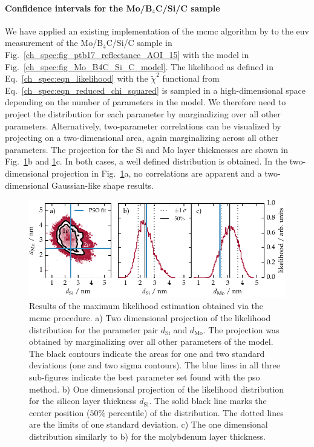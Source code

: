 \paragraph{Confidence intervals for the Mo/B$_4$C/Si/C sample}
We have applied an existing implementation of the \gls{mcmc} algorithm by \textcite{foreman-mackey_emcee:_2013} to the \gls{euv} measurement of the Mo/B$_4$C/Si/C sample in Fig.~\ref{ch_spec:fig_ptb17_reflectance_AOI_15} with the model in Fig.~\ref{ch_spec:fig_Mo_B4C_Si_C_model}. The likelihood as defined in Eq.~\eqref{ch_spec:eqn_likelihood} with the $\tilde{\chi}^2$ functional from Eq.~\eqref{ch_spec:eqn_reduced_chi_squared} is sampled in a high-dimensional space depending on the number of parameters in the model. We therefore need to project the distribution for each parameter by marginalizing over all other parameters. Alternatively, two-parameter correlations can be visualized by projecting on a two-dimensional area, again marginalizing across all other parameters. The projection for the Si and Mo layer thicknesses are shown in Fig.~\ref{ch_spec:fig_ptb17_MCMC_d_Mo_vs_d_Si}b and \ref{ch_spec:fig_ptb17_MCMC_d_Mo_vs_d_Si}c. In both cases, a well defined distribution is obtained. In the two-dimensional projection in Fig.~\ref{ch_spec:fig_ptb17_MCMC_d_Mo_vs_d_Si}a, no correlations are apparent and a two-dimensional Gaussian-like shape results.
\begin{figure}[htbp]
\centering
\includegraphics{img/PTB17_MCMC_d_Mo_vs_d_Si}
\caption{Results of the maximum likelihood estimation obtained via the \gls{mcmc} procedure. a) Two dimensional projection of the likelihood distribution for the parameter pair $d_\text{Si}$ and $d_\text{Mo}$. The projection was obtained by marginalizing over all other parameters of the model. The black contours indicate the areas for one and two standard deviations (one and two sigma contours). The blue lines in all three sub-figures indicate the best parameter set found with the \gls{pso} method. b) One dimensional projection of the likelihood distribution for the silicon layer thickness $d_\text{Si}$. The solid black line marks the center position ($50\%$ percentile) of the distribution. The dotted lines are the limits of one standard deviation. c) The one dimensional distribution similarly to b) for the molybdenum layer thickness.}
\label{ch_spec:fig_ptb17_MCMC_d_Mo_vs_d_Si}
\end{figure}

